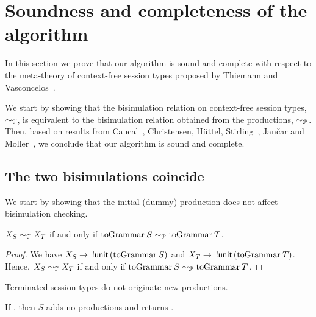 \section{Soundness and completeness of the algorithm}
\label{sec:soundness}

In this section we prove that our algorithm is sound and complete
with respect to the meta-theory of context-free session types proposed
by Thiemann and Vasconcelos~\cite{thiemann2016context}.

We start by showing that the bisimulation relation on context-free
session types, $\sim_\mathcal T$, is equivalent to the bisimulation
relation obtained from the productions, $\sim_\mathcal P$.  Then, based on
results from Caucal~\cite{caucal1986decidabilite}, Christensen,
H{\"{u}}ttel, Stirling~\cite{DBLP:journals/iandc/ChristensenHS95},
Jan{\v{c}}ar and Moller~\cite{janvcar1999techniques}, we conclude that
our algorithm is sound and complete.

\subsection{The two bisimulations coincide}

We start by showing that the initial (dummy) production does not
affect bisimulation checking.
%
\begin{lemma}
  $X_S \sim_\mathcal T X_T$ if and only if
  $\toGrammarf S \ProdEquiv \toGrammarf T$.
\end{lemma}

\begin{proof}
  We have $X_S \rightarrow\enspace \initialProd\,(\toGrammarf S)$
  and $X_T \rightarrow\enspace \initialProd\,(\toGrammarf T)$.
  Hence, $X_S \sim_\mathcal T X_T$ if and only if
  $\toGrammarf S \ProdEquiv \toGrammarf T$.
\end{proof}

Terminated session types do not originate new productions.

\begin{lemma}
  \label{lemma:terminated_session}
  If , then $S$ adds no
  productions and returns \upshape{\lstinline|[]|}.
\end{lemma}

